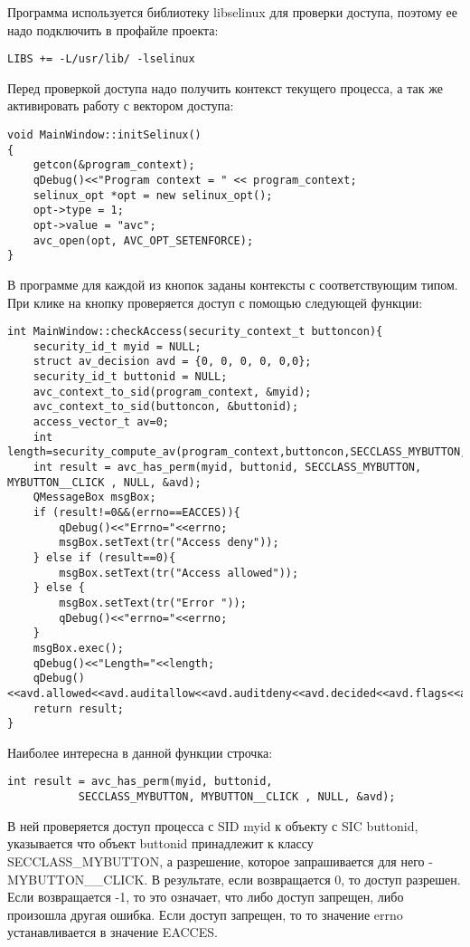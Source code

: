 \documentclass{./../class/UIR}
\begin{document}
    Программа используется библиотеку libselinux для проверки доступа, поэтому
    ее надо подключить в профайле проекта:
\begin{verbatim}
LIBS += -L/usr/lib/ -lselinux
\end{verbatim}

     Перед проверкой доступа надо получить контекст текущего процесса, а так же
     активировать работу с вектором доступа:
\begin{verbatim}
void MainWindow::initSelinux()
{
    getcon(&program_context);
    qDebug()<<"Program context = " << program_context;
    selinux_opt *opt = new selinux_opt();
    opt->type = 1;
    opt->value = "avc";
    avc_open(opt, AVC_OPT_SETENFORCE);
}
\end{verbatim}
    В программе для каждой из кнопок заданы контексты с соответствующим типом.
    При клике на кнопку проверяется доступ с помощью следующей функции:
\begin{verbatim}
int MainWindow::checkAccess(security_context_t buttoncon){
    security_id_t myid = NULL;
    struct av_decision avd = {0, 0, 0, 0, 0,0};
    security_id_t buttonid = NULL;
    avc_context_to_sid(program_context, &myid);
    avc_context_to_sid(buttoncon, &buttonid);
    access_vector_t av=0;
    int length=security_compute_av(program_context,buttoncon,SECCLASS_MYBUTTON,av,&avd);
    int result = avc_has_perm(myid, buttonid, SECCLASS_MYBUTTON, MYBUTTON__CLICK , NULL, &avd);
    QMessageBox msgBox;
    if (result!=0&&(errno==EACCES)){
        qDebug()<<"Errno="<<errno;
        msgBox.setText(tr("Access deny"));
    } else if (result==0){
        msgBox.setText(tr("Access allowed"));
    } else {
        msgBox.setText(tr("Error "));
        qDebug()<<"errno="<<errno;
    }
    msgBox.exec();
    qDebug()<<"Length="<<length;
    qDebug()<<avd.allowed<<avd.auditallow<<avd.auditdeny<<avd.decided<<avd.flags<<avd.seqno;
    return result;
}
    \end{verbatim}
	Наиболее интересна в данной функции строчка:
	\begin{verbatim}
int result = avc_has_perm(myid, buttonid,
           SECCLASS_MYBUTTON, MYBUTTON__CLICK ,	NULL, &avd);
	\end{verbatim}
	В ней проверяется доступ процесса с SID myid к объекту с SIC buttonid,
	указывается что объект buttonid принадлежит к классу SECCLASS\_MYBUTTON, а
	разрешение, которое запрашивается для него - MYBUTTON\_\_CLICK.
	В результате, если возвращается 0, то доступ разрешен. Если возвращается -1, то
	это означает, что либо доступ запрещен, либо произошла другая ошибка. Если
	доступ запрещен, то то значение errno устанавливается в значение EACCES.
	
\end{document}
